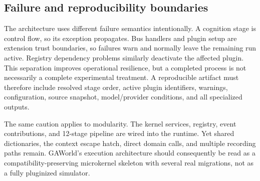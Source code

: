 \subsection{Failure and reproducibility boundaries}

The architecture uses different failure semantics intentionally.  A cognition
stage is control flow, so its exception propagates.  Bus handlers and plugin
setup are extension trust boundaries, so failures warn and normally leave the
remaining run active.  Registry dependency problems similarly deactivate the
affected plugin.  This separation improves operational resilience, but a
completed process is not necessarily a complete experimental treatment.  A
reproducible artifact must therefore include resolved stage order, active
plugin identifiers, warnings, configuration, source snapshot, model/provider
conditions, and all specialized outputs.

The same caution applies to modularity.  The kernel services, registry, event
contributions, and 12-stage pipeline are wired into the runtime.  Yet shared
dictionaries, the context escape hatch, direct domain calls, and multiple
recording paths remain.  GAWorld's execution architecture should consequently
be read as a compatibility-preserving microkernel skeleton with several real
migrations, not as a fully pluginized simulator.
